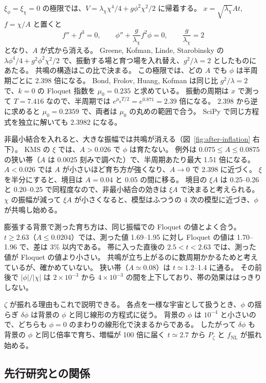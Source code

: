 \documentclass[a4paper,11pt]{ltjsarticle}
\newcommand{\fnl}{f_{\mathrm{NL}}}
\begin{document}
$\xi_\phi=\xi_\chi=0$ の極限では、$V=\lambda_\chi\chi^4/4+g\phi^2\chi^2/2$ に帰着する。
$x=\sqrt{\lambda_\chi}At$, $f=\chi/A$ と置くと
\[
f''+f^3=0,\qquad \phi''+\frac{g}{\lambda_\chi}f^2\phi=0,\qquad \frac{g}{\lambda_\chi}=2
\]
となり、$A$ が式から消える。
Greene, Kofman, Linde, Starobinsky\cite{GKLS1997} の $\lambda\phi^4/4+g^2\phi^2\chi^2/2$ で、振動する場と育つ場を入れ替え、$g^2/\lambda=2$ としたものにあたる。
共鳴の構造はこの比で決まる\cite{GKLS1997}。
この極限では、どの $A$ でも $\phi$ は半周期ごとに 2.398 倍になる。
Bond, Frolov, Huang, Kofman\cite{BFHK2009} は同じ比 $g^2/\lambda=2$ で、$k=0$ の Floquet 指数を $\mu_0=0.235$ と求めている。
振動の周期は $x$ で測って $T=7.416$ なので、半周期では $e^{\mu_0T/2}=e^{0.871}=2.39$ 倍になる。
2.398 から逆に求めると $\mu_0=0.2359$ で、両者は $\mu_0$ の丸めの範囲で合う。
SciPy で同じ方程式を独立に解いても 2.3982 になる。

非最小結合を入れると、大きな振幅では共鳴が消える（図~\ref{fig:after-inflation} 右下）。
KMS の $\xi$ では、$A>0.026$ で $\phi$ は育たない。
例外は $0.075\le A\le0.0875$ の狭い帯（$A$ は 0.0025 刻みで調べた）で、半周期あたり最大 1.51 倍になる。
$A<0.026$ では $A$ が小さいほど育ち方が強くなり、$A\to0$ で 2.398 に近づく。
$\xi$ を半分にすると、境目は $A=0.04$ と 0.05 の間に移る。
境目の $\xi A$ は 0.25--0.26 と 0.20--0.25 で同程度なので、非最小結合の効きは $\xi A$ で決まると考えられる。
$\chi$ の振幅が減って $\xi A$ が小さくなると、模型はふつうの 4 次の模型に近づき、$\phi$ が共鳴し始める。

膨張する背景で測った育ち方は、同じ振幅での Floquet の値とよく合う。
$t\ge2.63$（$A\le0.0204$）では、測った値 1.69--1.95 に対し Floquet の値は 1.70--1.96 で、差は 3\% 以内である。
帯に入った直後の $2.5<t<2.63$ では、測った値が Floquet の値より小さい。
共鳴が立ち上がるのに数周期かかるためと考えているが、確かめていない。
狭い帯（$A\simeq0.08$）は $t\simeq1.2$--1.4 に通る。
その前後で $|\phi|/|\chi|$ は $2\times10^{-3}$ から $4\times10^{-3}$ の間を上下しており、帯の効果ははっきりしない。

$\zeta$ が振れる理由もこれで説明できる。
各点を一様な宇宙として扱うとき、$\phi$ の揺らぎ $\delta\phi$ は背景の $\phi$ と同じ線形の方程式に従う。
背景の $\phi$ は $10^{-4}$ と小さいので、どちらも $\phi=0$ のまわりの線形化で決まるからである。
したがって $\delta\phi$ も背景の $\phi$ と同じ倍率で育ち、増幅が 100 倍に届く $t\simeq2.7$ から $P_\zeta$ と $\fnl$ が振れ始める。

\subsection{先行研究との関係}
\label{sec:after-prior}
\end{document}
